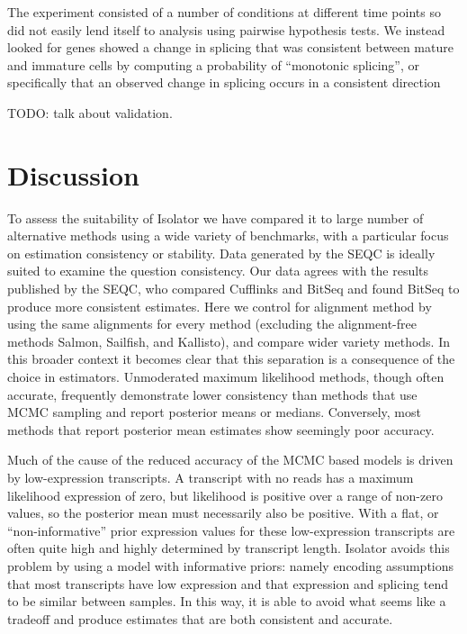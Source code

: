 \documentclass[twocolumn]{article}
\begin{document}
The experiment consisted of a number of conditions at different time
points so did not easily lend itself to analysis using pairwise
hypothesis tests. We instead looked for genes showed a change in
splicing that was consistent between mature and immature cells by
computing a probability of ``monotonic splicing'', or specifically that
an observed change in splicing occurs in a consistent direction

TODO: talk about validation.

\section{Discussion}\label{discussion}

To assess the suitability of Isolator we have compared it to large
number of alternative methods using a wide variety of benchmarks, with a
particular focus on estimation consistency or stability. Data generated
by the SEQC is ideally suited to examine the question consistency. Our
data agrees with the results published by the SEQC, who compared
Cufflinks and BitSeq and found BitSeq to produce more consistent
estimates. Here we control for alignment method by using the same
alignments for every method (excluding the alignment-free methods
Salmon, Sailfish, and Kallisto), and compare wider variety methods. In
this broader context it becomes clear that this separation is a
consequence of the choice in estimators. Unmoderated maximum likelihood
methods, though often accurate, frequently demonstrate lower consistency
than methods that use MCMC sampling and report posterior means or
medians. Conversely, most methods that report posterior mean estimates
show seemingly poor accuracy.

Much of the cause of the reduced accuracy of the MCMC based models is
driven by low-expression transcripts. A transcript with no reads has a
maximum likelihood expression of zero, but likelihood is positive over a
range of non-zero values, so the posterior mean must necessarily also be
positive. With a flat, or ``non-informative'' prior expression values
for these low-expression transcripts are often quite high and highly
determined by transcript length. Isolator avoids this problem by using a
model with informative priors: namely encoding assumptions that most
transcripts have low expression and that expression and splicing tend to
be similar between samples. In this way, it is able to avoid what seems
like a tradeoff and produce estimates that are both consistent and
accurate.
\end{document}

